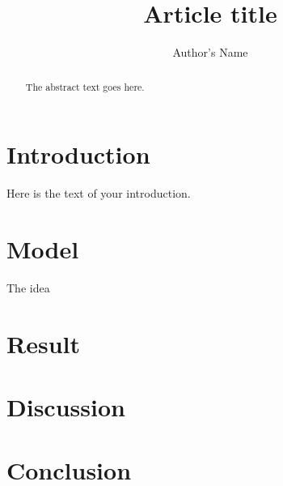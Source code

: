 \documentclass{article}
\begin{document}
\title{Article title}
\author{Author's Name}

\maketitle

\begin{abstract}
The abstract text goes here.
\end{abstract}

\section{Introduction}
Here is the text of your introduction.

\section{Model}
The idea
\section{Result}
\section{Discussion}


\section{Conclusion}
\end{document}
